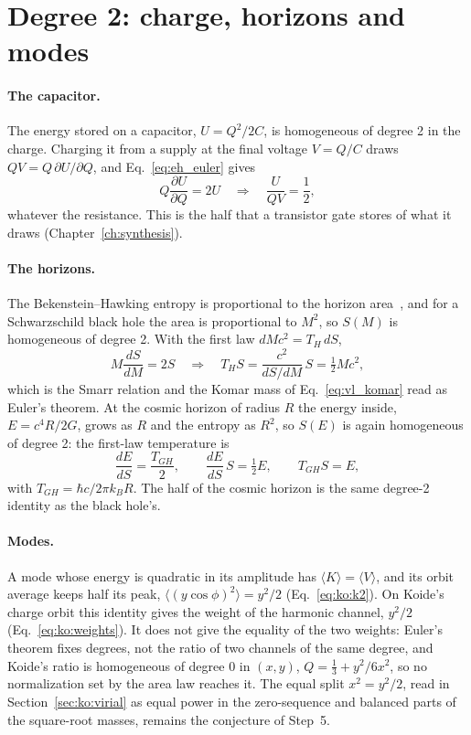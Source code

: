 \section{Degree 2: charge, horizons and modes}\label{sec:eh_branch2}
\paragraph{The capacitor.} The energy stored on a capacitor, $U=Q^2/2C$, is homogeneous of degree 2 in the charge. Charging it from a supply at the
final voltage $V=Q/C$ draws $QV=Q\,\partial U/\partial Q$, and Eq.~\eqref{eq:eh_euler} gives
\begin{equation}
Q\frac{\partial U}{\partial Q}=2U\quad\Longrightarrow\quad\frac{U}{QV}=\frac12 ,\label{eq:eh_cap}
\end{equation}
whatever the resistance. \derived{} This is the half that a transistor gate stores of what it draws (Chapter~\ref{ch:synthesis}).

\paragraph{The horizons.} The Bekenstein--Hawking entropy is proportional to the horizon area~\cite{Bekenstein1973,Hawking1975}, and for a
Schwarzschild black hole the area is proportional to $M^2$, so $S(M)$ is homogeneous of degree 2. With the first law $dMc^2=T_H\,dS$,
\begin{equation}
M\frac{dS}{dM}=2S\quad\Longrightarrow\quad T_HS=\frac{c^2}{dS/dM}\,S=\tfrac12Mc^2 ,\label{eq:eh_area}
\end{equation}
which is the Smarr relation and the Komar mass of Eq.~\eqref{eq:vl_komar} read as Euler's theorem. \derived{} At the cosmic horizon of radius $R$
the energy inside, $E=c^4R/2G$, grows as $R$ and the entropy as $R^2$, so $S(E)$ is again homogeneous of degree 2: the first-law temperature is
\begin{equation}
\frac{dE}{dS}=\frac{T_{GH}}{2},\qquad \frac{dE}{dS}\,S=\tfrac12E,\qquad T_{GH}S=E ,\label{eq:eh_dS}
\end{equation}
with $T_{GH}=\hbar c/2\pi k_BR$. \derived{} The half of the cosmic horizon is the same degree-2 identity as the black hole's.

\paragraph{Modes.} A mode whose energy is quadratic in its amplitude has $\langle K\rangle=\langle V\rangle$, and its orbit average keeps half its
peak, $\langle(y\cos\phi)^2\rangle=y^2/2$ (Eq.~\eqref{eq:ko:k2}). \derived{} On Koide's charge orbit this identity gives the weight of the
harmonic channel, $y^2/2$ (Eq.~\eqref{eq:ko:weights}). It does not give the equality of the two weights: Euler's theorem fixes degrees, not the
ratio of two channels of the same degree, and Koide's ratio is homogeneous of degree 0 in $(x,y)$, $Q=\tfrac13+y^2/6x^2$, so no normalization set
by the area law reaches it. \derived{} The equal split $x^2=y^2/2$, read in Section~\ref{sec:ko:virial} as equal power in the zero-sequence and
balanced parts of the square-root masses, remains the conjecture of Step~5. \conjecture

